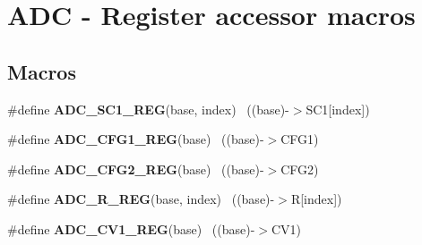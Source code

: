 \hypertarget{group___a_d_c___register___accessor___macros}{}\section{A\+D\+C -\/ Register accessor macros}
\label{group___a_d_c___register___accessor___macros}
\subsection*{Macros}
\begin{DoxyCompactItemize}
\item 
\hypertarget{group___a_d_c___register___accessor___macros_ga222b4f9dbc62d3e7cdc7fab81d736b1f}{}\#define {\bfseries A\+D\+C\+\_\+\+S\+C1\+\_\+\+R\+E\+G}(base,  index)                                ~((base)-\/$>$S\+C1\mbox{[}index\mbox{]})\label{group___a_d_c___register___accessor___macros_ga222b4f9dbc62d3e7cdc7fab81d736b1f}

\item 
\hypertarget{group___a_d_c___register___accessor___macros_ga1d379c53bd79f7568c89802f14ae147a}{}\#define {\bfseries A\+D\+C\+\_\+\+C\+F\+G1\+\_\+\+R\+E\+G}(base)                                          ~((base)-\/$>$C\+F\+G1)\label{group___a_d_c___register___accessor___macros_ga1d379c53bd79f7568c89802f14ae147a}

\item 
\hypertarget{group___a_d_c___register___accessor___macros_ga95c3a7cebd9170a6d22b0176e8167899}{}\#define {\bfseries A\+D\+C\+\_\+\+C\+F\+G2\+\_\+\+R\+E\+G}(base)                                          ~((base)-\/$>$C\+F\+G2)\label{group___a_d_c___register___accessor___macros_ga95c3a7cebd9170a6d22b0176e8167899}

\item 
\hypertarget{group___a_d_c___register___accessor___macros_gaa73e4be773e5276ec891d3ae1cfd7944}{}\#define {\bfseries A\+D\+C\+\_\+\+R\+\_\+\+R\+E\+G}(base,  index)                                    ~((base)-\/$>$R\mbox{[}index\mbox{]})\label{group___a_d_c___register___accessor___macros_gaa73e4be773e5276ec891d3ae1cfd7944}

\item 
\hypertarget{group___a_d_c___register___accessor___macros_gaf1a44ade9e2d74c7a84112c805324a85}{}\#define {\bfseries A\+D\+C\+\_\+\+C\+V1\+\_\+\+R\+E\+G}(base)                                            ~((base)-\/$>$C\+V1)\label{group___a_d_c___register___accessor___macros_gaf1a44ade9e2d74c7a84112c805324a85}


\end{DoxyCompactItemize}
